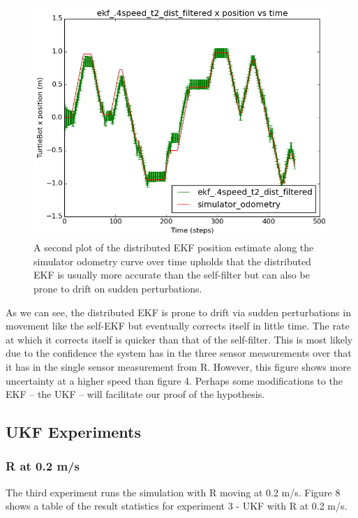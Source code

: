 \documentclass[conference]{IEEEtran} \usepackage[T1]{fontenc} \usepackage[backend=biber, style=ieee]{biblatex}
\begin{document}
\begin{figure}[!ht]
\label{pic7} 
\centering 
\includegraphics[scale=.45]{ekf_4speed_t2_dist_filtered_pos_err_graph}
\caption {A second plot of the distributed EKF position estimate along the simulator odometry curve over time 
upholds that the distributed EKF is usually more accurate than the self-filter but can also be prone to drift on sudden 
perturbations.}
\end{figure}

As we can see, the distributed EKF is prone to drift via sudden perturbations in movement like the self-EKF but 
eventually corrects itself in little time. The rate at which it corrects itself is quicker than that of the self-filter. 
This is most likely due to the confidence the system has in the three sensor measurements over that it has in the single 
sensor measurement from R. However, this figure shows more uncertainty at a higher speed than figure 4. Perhaps some 
modifications to the EKF -- the UKF -- will facilitate our proof of the hypothesis.

\subsection{UKF Experiments} \label{UKF Experiments}
\subsubsection{R at 0.2 m/s} \label{R at 0.2 m/s}
The third experiment runs the simulation with R moving at 0.2 m/s. Figure 8 shows a table of the result statistics for experiment 3 - UKF 
with R at 0.2 m/s. 
\end{document}
